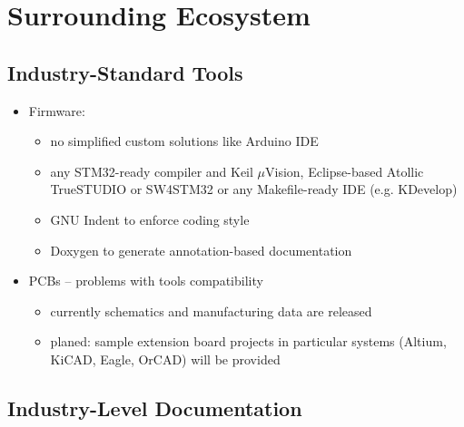 \section{Surrounding Ecosystem}
\subsection{Industry-Standard Tools}

\begin{frame}%

         \begin{itemize}
           \item Firmware: 
            \begin{itemize}
               \item no simplified custom solutions like Arduino IDE
               \item any STM32-ready compiler and Keil $\mu$Vision, Eclipse-based Atollic TrueSTUDIO or SW4STM32 or any Makefile-ready IDE (e.g. KDevelop)
               \item GNU Indent to enforce coding style
               \item Doxygen to generate annotation-based documentation
            \end{itemize}
           \item PCBs -- problems with tools compatibility
           \begin{itemize}
               \item currently schematics and manufacturing data are released
               \item planed: sample extension board projects in particular systems (Altium, KiCAD, Eagle, OrCAD) will be provided
            \end{itemize}
         \end{itemize}
  
\end{frame}

\subsection{Industry-Level Documentation}

